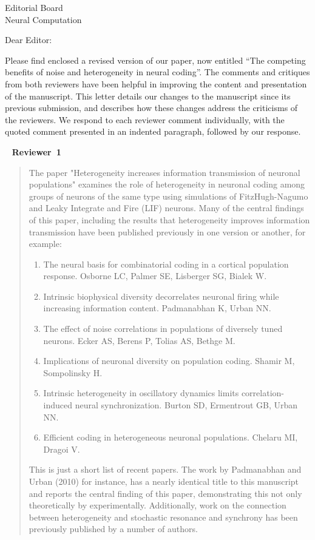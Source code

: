 \documentclass[]{letter}
\date{\today}
\begin{document}
\begin{letter}{Editorial Board\\Neural Computation}
\opening{Dear Editor:}

Please find enclosed a revised version of our paper, now entitled ``The competing benefits of noise and heterogeneity in neural coding''. The comments and critiques from both reviewers have been helpful in improving the content and presentation of the manuscript. This letter details our changes to the manuscript since its previous submission, and describes how these changes address the criticisms of the reviewers. We respond to each reviewer comment individually, with the quoted comment presented in an indented paragraph, followed by our response.


\ \newline
{\large \bf Reviewer~1}

\begin{quotation}
  The paper "Heterogeneity increases information transmission of neuronal populations" examines the role of heterogeneity in neuronal coding among groups of neurons of the same type using simulations of FitzHugh-Nagumo and Leaky Integrate and Fire (LIF) neurons.  Many of the central findings of this paper, including the results that heterogeneity improves information transmission have been published previously in one version or another, for example:

  \begin{enumerate}[label=\arabic*)]
  \item The neural basis for combinatorial coding in a cortical population response.
    Osborne LC, Palmer SE, Lisberger SG, Bialek W.
  \item Intrinsic biophysical diversity decorrelates neuronal firing while increasing information content. Padmanabhan K, Urban NN.
  \item The effect of noise correlations in populations of diversely tuned neurons. Ecker AS, Berens P, Tolias AS, Bethge M.
  \item Implications of neuronal diversity on population coding. Shamir M, Sompolinsky H.
  \item Intrinsic heterogeneity in oscillatory dynamics limits correlation-induced neural synchronization. Burton SD, Ermentrout GB, Urban NN.
  \item Efficient coding in heterogeneous neuronal populations. Chelaru MI, Dragoi V.
  \end{enumerate}

  This is just a short list of recent papers.  The work by Padmanabhan and Urban (2010) for instance, has a nearly identical title to this manuscript and reports the central finding of this paper, demonstrating this not only theoretically by experimentally.  Additionally, work on the connection between heterogeneity and stochastic resonance and synchrony has been previously published by a number of authors.


\end{quotation}
\end{letter}
\end{document}
